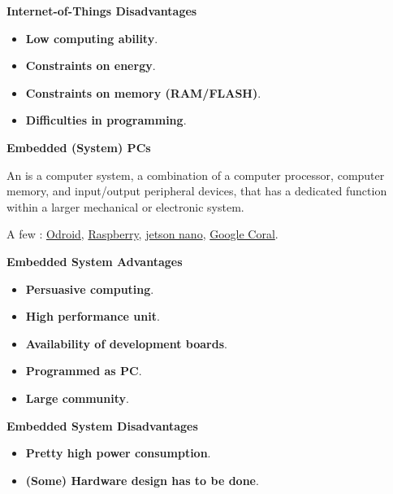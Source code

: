 \begin{flushleft}
    \textcolor{Red2}{ \textbf{Internet-of-Things Disadvantages}}
\end{flushleft}
\begin{itemize}
    \item \textbf{Low computing ability}.
    \item \textbf{Constraints on energy}.
    \item \textbf{Constraints on memory (RAM/FLASH)}.
    \item \textbf{Difficulties in programming}.
\end{itemize}

\longline

\begin{center}
    \large
    \textcolor{Red3}{\textbf{Embedded (System) PCs}}
\end{center}

\noindent
An  is a computer system, a combination of a computer processor, computer memory, and input/output peripheral devices, that has a dedicated function within a larger mechanical or electronic system.

\highspace
A few : \href{https://www.hardkernel.com/}{Odroid}, \href{https://www.raspberrypi.com/}{Raspberry}, \href{https://developer.nvidia.com/embedded/jetson-nano}{jetson nano}, \href{https://www.coral.ai/}{Google Coral}.

\begin{flushleft}
    \textcolor{Green3}{ \textbf{Embedded System Advantages}}
\end{flushleft}
\begin{itemize}
    \item \textbf{Persuasive computing}.
    \item \textbf{High performance unit}.
    \item \textbf{Availability of development boards}.
    \item \textbf{Programmed as PC}.
    \item \textbf{Large community}.
\end{itemize}

\begin{flushleft}
    \textcolor{Red2}{ \textbf{Embedded System Disadvantages}}
\end{flushleft}
\begin{itemize}
    \item \textbf{Pretty high power consumption}.
    \item \textbf{(Some) Hardware design has to be done}.
\end{itemize}

